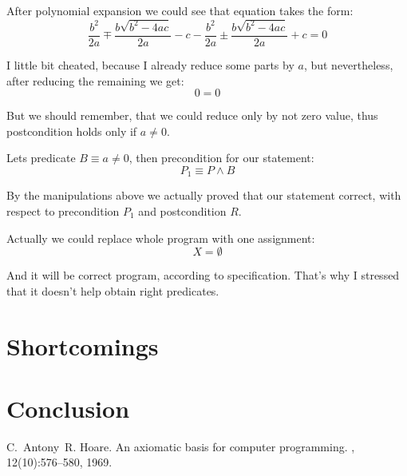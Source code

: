 \documentclass[twoside,twocolumn]{article}
\begin{document}
After polynomial expansion we could see that equation takes the form:
$$\frac{b^2}{2a} \mp \frac{b\sqrt{b^2 - 4ac}}{2a} - c - \frac{b^2}{2a} \pm
\frac{b\sqrt{b^2 - 4ac}}{2a} + c = 0$$

I little bit cheated, because I already reduce some parts by $a$, but
nevertheless, after reducing the remaining we get:
$$ 0 = 0 $$

But we should remember, that we could reduce only by not zero value, thus
postcondition holds only if $a \neq 0$.

Lets predicate $B \equiv a \neq 0$, then precondition for our statement:
$$ P_1 \equiv P \wedge B $$

By the manipulations above we actually proved that our statement correct, with
respect to precondition $P_1$ and postcondition $R$.

Actually we could replace whole program with one assignment:
$$ X = \emptyset $$

And it will be correct program, according to specification. That's why I
stressed that it doesn't help obtain right predicates. 












\section{Shortcomings}

\section{Conclusion}

\begin{thebibliography}{99} %

C.~Antony~R. Hoare.
\newblock An axiomatic basis for computer programming.
, 12(10):576--580, 1969.

\end{thebibliography}

\end{document}
